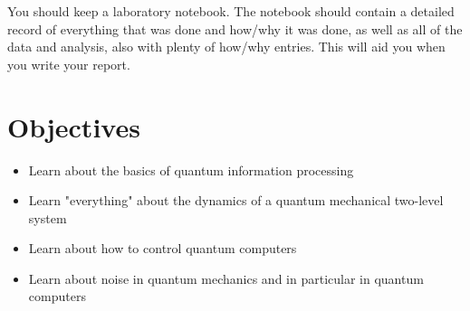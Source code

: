\documentclass{../lab}
\begin{document}
You should keep a laboratory notebook. The notebook should contain a detailed record of everything that was done and how/why it was done, as well as all of the data and analysis, also with plenty of how/why entries. This will aid you when you write your report.


\section{Objectives}

\begin{itemize}
    \item Learn about the basics of quantum information processing
    \item Learn "everything" about the dynamics of a quantum mechanical two-level system
    \item Learn about how to control quantum computers
    \item Learn about noise in quantum mechanics and in particular in quantum computers
\end{itemize}
\end{document}
